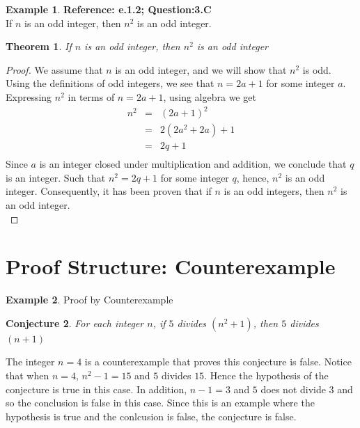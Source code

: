 \documentclass{book}
\newtheorem{theorem}{Theorem}[section]
\newtheorem{conjecture}[theorem]{Conjecture}
\theoremstyle{definition}
\newtheorem{example}{Example}[definition]
\theoremstyle{remark}
\begin{document}
\begin{example}
{\bf Reference: e.1.2; Question:3.C} \\
If $n$ is an odd integer, then $n^2$ is an odd integer. \\

\begin{tcolorbox}
	\begin{theorem}
		If $n$ is an odd integer, then $n^2$ is an odd integer
	\end{theorem}
\end{tcolorbox}

\begin{proof}
We assume that $n$ is an odd integer, and we will show that $n^2$ is odd. Using the definitions of odd integers, we see that $n = 2a + 1$ for some integer $a$. Expressing $n^2$ in terms of $n = 2a + 1$, using algebra we get
\begin{eqnarray*}
n^2 & = & (2a + 1)^2  \nonumber \\
& = & 2(2a^2 + 2a) + 1 \nonumber \\
& = & 2q + 1 \nonumber \\
\end{eqnarray*}
Since $a$ is an integer closed under multiplication and addition, we conclude that $q$ is an integer. Such that $n^2 = 2q + 1$ for some integer $q$, hence, $n^2$ is an odd integer. Consequently, it has been proven that if $n$ is an odd integers, then $n^2$ is an odd integer. \\
\end{proof}
\end{example}



\newpage
\section{Proof Structure: Counterexample}

\begin{example}
Proof by Counterexample

\begin{tcolorbox}
	\begin{conjecture}
		For each integer $n$, if $5$ divides $(n^2 + 1 )$, then $5$ divides $(n + 1)$
	\end{conjecture}
\end{tcolorbox}

The integer $n = 4$ is a counterexample that proves this conjecture is false. Notice that when $n=4$, $n^2 - 1 = 15$ and $5$ divides $15$. Hence the hypothesis of the conjecture is true in this case. In addition, $n - 1 = 3$ and $5$ does not divide $3$ and so the conclusion is false in this case. Since this is an example where the hypothesis is true and the conlcusion is false, the conjecture is false. 
\end{example}
\end{document}
